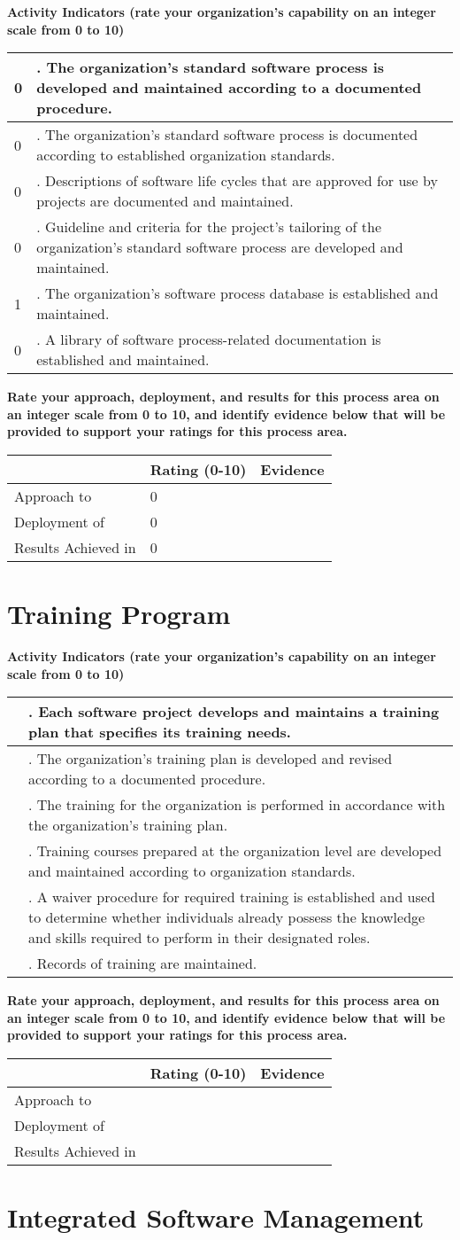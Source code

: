 \documentclass{article}
\newcommand{\KPAname}{}
\newenvironment{KPARate}[1]
	{\renewcommand{\KPAname}{#1}
	 {\bf Rate your approach, deployment, and results for
	  this process area on an integer scale from 0 to 10, and 
	  identify evidence below that will be provided to support your
	  ratings for this process area.}
	 \begin{center}
	 \begin{tabular}{|p{1.0in}|p{0.5in}|p{5.0in}|} \hline
	 & Rating (0-10) & \multicolumn{1}{c|}{Evidence} \\ \hline}
	{\end{tabular}
	 \end{center}}
\newcommand{\Approach}[2]{Approach to \KPAname & #1 & #2 \\ \hline}
\newcommand{\Deployment}[2]{Deployment of \KPAname & #1 & #2 \\ \hline}
\newcommand{\Results}[2]{Results Achieved in \KPAname & #1 & #2 \\
	\hline}
\newcounter{activity}
\newenvironment{KPAActivity}
	{
	 \setcounter{activity}{0}
	 {\bf Activity Indicators (rate your organization's capability
	 on an integer scale from 0 to 10)}
	 \begin{center}
	 \begin{tabular}{|p{0.5in}|p{6.0in}|} \hline
	}
	{
	 \end{tabular}
	 \end{center}
	}
\newcommand{\Activity}[2]{\stepcounter{activity} #1 &
\arabic{activity}. #2 \\ \hline}
\begin{document}
\begin{KPAActivity}
\Activity{0}{The organization's standard software process is
developed and maintained according to a documented procedure.}
\Activity{0}{The organization's standard software process is
documented according to established organization standards.}
\Activity{0}{Descriptions of software life cycles that are approved
for use by projects are documented and maintained.}
\Activity{0}{Guideline and criteria for the project's tailoring of
the organization's standard software process are developed and
maintained.}
\Activity{1}{The organization's software process database is
established and maintained.}
\Activity{0}{A library of software process-related documentation is
established and maintained.}
\end{KPAActivity}

\begin{KPARate}{Organization Process Definition}
\Approach{0}{}
\Deployment{0}{}
\Results{0}{}
\end{KPARate}

\newpage
\section{Training Program}

\begin{KPAActivity}
\Activity{}{Each software project develops and maintains a training
plan that specifies its training needs.}
\Activity{}{The organization's training plan is developed and
revised according to a documented procedure.}
\Activity{}{The training for the organization is performed in
accordance with the organization's training plan.}
\Activity{}{Training courses prepared at the organization level are
developed and maintained according to organization standards.}
\Activity{}{A waiver procedure for required training is established
and used to determine whether individuals already possess the
knowledge and skills required to perform in their designated roles.}
\Activity{}{Records of training are maintained.}
\end{KPAActivity}

\begin{KPARate}{Training Program}
\Approach{}{}
\Deployment{}{}
\Results{}{}
\end{KPARate}

\newpage
\section{Integrated Software Management}
\end{document}
